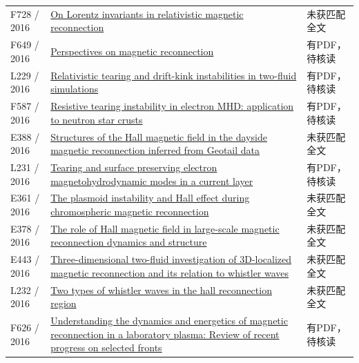 \begin{longtable}{P{24mm}P{97mm}P{27mm}}
F728 / 2016 & \href{https://doi.org/10.1063/1.4961431}{On Lorentz invariants in relativistic magnetic reconnection} & 未获匹配全文\\

F649 / 2016 & \href{https://doi.org/10.1098/rspa.2016.0479}{Perspectives on magnetic reconnection} & 有PDF，待核读\\

L229 / 2016 & \href{https://doi.org/10.1093/mnras/stw384}{Relativistic tearing and drift-kink instabilities in two-fluid simulations} & 有PDF，待核读\\

F587 / 2016 & \href{https://doi.org/10.1093/mnras/stw2309}{Resistive tearing instability in electron MHD: application to neutron star crusts} & 有PDF，待核读\\

E388 / 2016 & \href{http://ui.adsabs.harvard.edu/abs/2016AGUFMSM13A2184T/abstract}{Structures of the Hall magnetic field in the dayside magnetic reconnection inferred from Geotail data} & 未获匹配全文\\

L231 / 2016 & \href{https://doi.org/10.1063/1.4943053}{Tearing and surface preserving electron magnetohydrodynamic modes in a current layer} & 有PDF，待核读\\

E361 / 2016 & \href{https://ui.adsabs.harvard.edu/abs/2016AAS...22714103M/abstract}{The plasmoid instability and Hall effect during chromospheric magnetic reconnection} & 未获匹配全文\\

E378 / 2016 & \href{https://confit.atlas.jp/guide/event/jpgu2016/subject/PEM17-11/detail}{The role of Hall magnetic field in large-scale magnetic reconnection dynamics and structure} & 未获匹配全文\\

E443 / 2016 & \href{http://absimage.aps.org/image/DPP16/MWS_DPP16-2016-000133.pdf}{Three-dimensional two-fluid investigation of 3D-localized magnetic reconnection and its relation to whistler waves} & 未获匹配全文\\

L232 / 2016 & \href{https://doi.org/10.1002/2016ja022650}{Two types of whistler waves in the hall reconnection region} & 未获匹配全文\\

F626 / 2016 & \href{https://doi.org/10.1063/1.4948721}{Understanding the dynamics and energetics of magnetic reconnection in a laboratory plasma: Review of recent progress on selected fronts} & 有PDF，待核读\\


\end{longtable}
